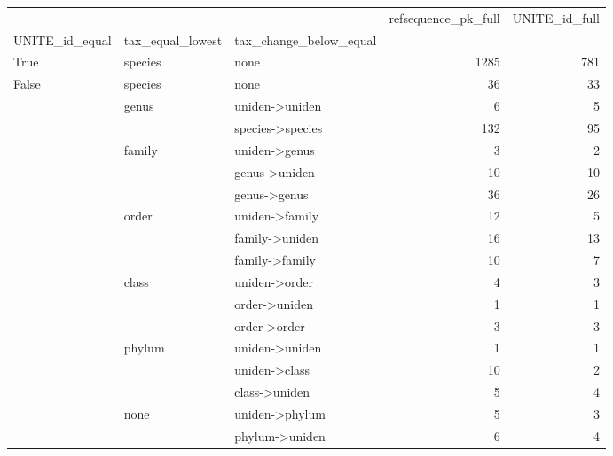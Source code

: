 \begin{tabular}{lllrr}
\toprule
 &  &  & refsequence\_pk\_full & UNITE\_id\_full \\
UNITE_id_equal & tax_equal_lowest & tax_change_below_equal &  &  \\
\midrule
True & species & none & 1285 & 781 \\
\cline{1-5} \cline{2-5}
\multirow[t]{17}{*}{False} & species & none & 36 & 33 \\
\cline{2-5}
 & \multirow[t]{2}{*}{genus} & uniden->uniden & 6 & 5 \\
 &  & species->species & 132 & 95 \\
\cline{2-5}
 & \multirow[t]{3}{*}{family} & uniden->genus & 3 & 2 \\
 &  & genus->uniden & 10 & 10 \\
 &  & genus->genus & 36 & 26 \\
\cline{2-5}
 & \multirow[t]{3}{*}{order} & uniden->family & 12 & 5 \\
 &  & family->uniden & 16 & 13 \\
 &  & family->family & 10 & 7 \\
\cline{2-5}
 & \multirow[t]{3}{*}{class} & uniden->order & 4 & 3 \\
 &  & order->uniden & 1 & 1 \\
 &  & order->order & 3 & 3 \\
\cline{2-5}
 & \multirow[t]{3}{*}{phylum} & uniden->uniden & 1 & 1 \\
 &  & uniden->class & 10 & 2 \\
 &  & class->uniden & 5 & 4 \\
\cline{2-5}
 & \multirow[t]{2}{*}{none} & uniden->phylum & 5 & 3 \\
 &  & phylum->uniden & 6 & 4 \\
\cline{1-5} \cline{2-5}
\bottomrule
\end{tabular}
